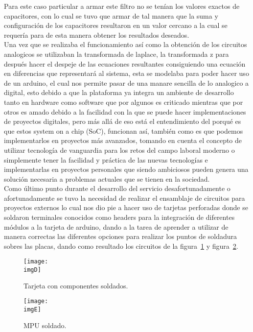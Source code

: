 \documentclass[a4paper,12pt]{article}
\newcommand{\imgD}{img/perforada.png}
\newcommand{\imgE}{img/mpu.png}
\begin{document}
    Para este caso particular a armar este filtro no se tenían los valores exactos de capacitores, con lo cual se tuvo que armar de tal manera que la suma y configuración de los capacitores resultaron en un valor cercano a la cual se requería para de esta manera obtener los resultados deseados.\\
    Una vez que se realizaba el funcionamiento así como la obtención de los circuitos analogicos se utilizaban la transformada de laplace, la transformada z para después hacer el despeje de las ecuaciones resultantes consiguiendo una ecuación en diferencias que representará al sistema, esta se modelaba para poder hacer uso de un arduino, el cual nos permite pasar de una manare sencilla de lo analogico a digital, esto debido a que la plataforma ya integra un ambiente de desarrollo tanto en hardware como software que por algunos es criticado mientras que por otros es amado debido a la facilidad con la que se puede hacer implementaciones de proyectos digitales, pero más allá de eso está el entendimiento del porqué es que estos system on a chip (SoC), funcionan así, también como es que podemos implementarlos en proyectos más avanzados, tomando en cuenta el concepto de utilizar tecnología de vanguardia para los retos del campo laboral moderno o simplemente tener la facilidad y práctica de las nuevas tecnologías e implementarlas en proyectos personales que siendo ambiciosos pueden genera una solución necesaria a problemas actuales que se tienen en la sociedad.\\
    Como último punto durante el desarrollo del servicio desafortunadamente o afortunadamente  se tuvo la necesidad de realizar el ensamblaje de circuitos para proyectos externos lo cual nos dio pie a hacer uso de tarjetas perforadas donde se soldaron terminales conocidos como headers para la integración de diferentes módulos a la tarjeta de arduino, dando a la tarea de aprender a utilizar de manera correctas las diferentes opciones para realizar los puntos de soldadura sobres las placas, dando como resultado los circuitos de la figura~\ref{fig:D} y figura~\ref{fig:E}.
    \begin{figure}[H] 
        \centering 
        \texttt{[image: \\imgD]} 
        \caption{Tarjeta con componentes soldados.} 
        \label{fig:D} 
    \end{figure} 
    \begin{figure}[H] 
        \centering 
        \texttt{[image: \\imgE]} 
        \caption{MPU soldado.} 
        \label{fig:E} 
    \end{figure} 
\end{document}
